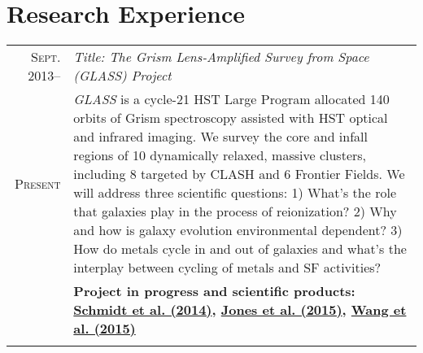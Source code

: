 \documentclass[10pt]{article}
\begin{document}
\section{Research Experience}
\vspace{-1ex}
\begin{longtable}{r|p{17cm}}
  \textsc{Sept. 2013}--  &   \emph{Title: The Grism Lens-Amplified Survey from Space (GLASS) Project}   \\
  \textsc{Present}       &   \small{\textit{GLASS} is a cycle-21 HST Large Program allocated 140 orbits of Grism spectroscopy
  assisted with HST optical and infrared imaging. We survey the core and infall regions of 10 dynamically relaxed, massive
  clusters, including 8 targeted by CLASH and 6 Frontier Fields. We will address three scientific questions: 1) What's the role that
  galaxies play in the process of reionization? 2) Why and how is galaxy evolution environmental dependent? 3) How do metals cycle
  in and out of galaxies and what's the interplay between cycling of metals and SF activities?}   \\
  &   \textbf{Project in progress and scientific products: \hyperlink{14.schmidt.apjl}{Schmidt et al. (2014)},
  \hyperlink{15.jones.aj}{Jones et al. (2015)}, \hyperlink{15.wang.apj}{Wang et al. (2015)} } \\
  \multicolumn{2}{c}{} \\

\end{longtable}
\end{document}
